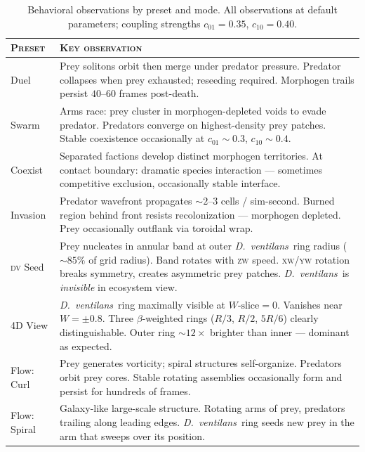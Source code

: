 \documentclass[11pt,a4paper]{article}
\newcommand{\spc}[1]{\textit{#1}}  %
\newcommand{\DV}{\spc{D.\ ventilans}}
\begin{document}
\begin{table}[h!]
\small\sffamily
\renewcommand{\arraystretch}{1.25}
\begin{tabularx}{\linewidth}{@{}l >{\raggedright\arraybackslash}X@{}}
\toprule
\textsc{Preset} & \textsc{Key observation}\\
\midrule
Duel         & Prey solitons orbit then merge under predator pressure. Predator collapses when prey exhausted; reseeding required. Morphogen trails persist $40$–$60$ frames post-death.\\
Swarm        & Arms race: prey cluster in morphogen-depleted voids to evade predator. Predators converge on highest-density prey patches. Stable coexistence occasionally at $c_{01}\!\sim\!0.3$, $c_{10}\!\sim\!0.4$.\\
Coexist      & Separated factions develop distinct morphogen territories. At contact boundary: dramatic species interaction --- sometimes competitive exclusion, occasionally stable interface.\\
Invasion     & Predator wavefront propagates $\sim 2$–$3$ cells / sim-second. Burned region behind front resists recolonization --- morphogen depleted. Prey occasionally outflank via toroidal wrap.\\
\rowcolor{codebg}\textsc{dv} Seed    & Prey nucleates in annular band at outer \DV\ ring radius ($\sim 85\%$ of grid radius). Band rotates with \textsc{zw} speed. \textsc{xw/yw} rotation breaks symmetry, creates asymmetric prey patches. \DV\ is \textit{invisible} in ecosystem view.\\
4D View      & \DV\ ring maximally visible at $W\text{-slice}=0$. Vanishes near $W=\pm 0.8$. Three $\beta$-weighted rings ($R/3$, $R/2$, $5R/6$) clearly distinguishable. Outer ring $\sim 12\times$ brighter than inner --- dominant as expected.\\
Flow: Curl   & Prey generates vorticity; spiral structures self-organize. Predators orbit prey cores. Stable rotating assemblies occasionally form and persist for hundreds of frames.\\
Flow: Spiral & Galaxy-like large-scale structure. Rotating arms of prey, predators trailing along leading edges. \DV\ ring seeds new prey in the arm that sweeps over its position.\\
\bottomrule
\end{tabularx}
\caption{\small Behavioral observations by preset and mode. All observations
at default parameters; coupling strengths $c_{01}=0.35$, $c_{10}=0.40$.}
\end{table}
\end{document}
